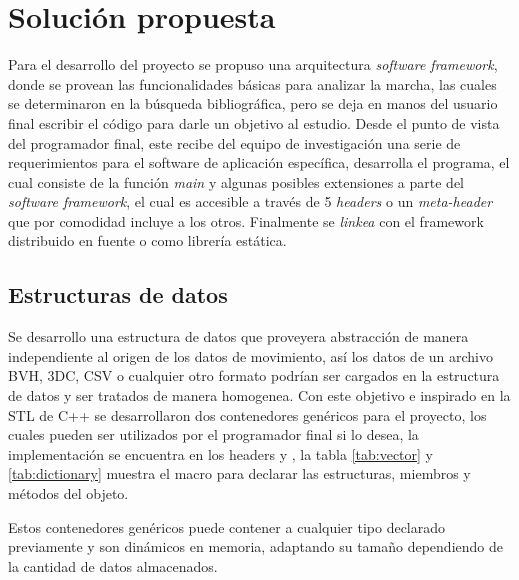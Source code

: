 \chapter{Solución propuesta}

Para el desarrollo del proyecto se propuso una arquitectura \emph{software framework}, donde se provean las funcionalidades básicas para analizar la marcha, las cuales se determinaron en la búsqueda bibliográfica, pero se deja en manos del usuario final escribir el código para darle un objetivo al estudio. Desde el punto de vista del programador final, este recibe del equipo de investigación una serie de requerimientos para el software de aplicación específica, desarrolla el programa, el cual consiste de la función \emph{main} y algunas posibles extensiones a parte del \emph{software framework}, el cual es accesible a través de 5 \emph{headers} o un \emph{meta-header} que por comodidad incluye a los otros. Finalmente se \emph{linkea} con el framework distribuido en fuente o como librería estática. 

\section{Estructuras de datos}

Se desarrollo una estructura de datos que proveyera abstracción de manera independiente al origen de los datos de movimiento, así los datos de un archivo BVH, 3DC, CSV o cualquier otro formato podrían ser cargados en la estructura de datos y ser tratados de manera homogenea. Con este objetivo e inspirado en la STL de C++ se desarrollaron dos contenedores genéricos para el proyecto, los cuales pueden ser utilizados por el programador final si lo desea, la implementación se encuentra en los headers  y , la tabla \ref{tab:vector} y \ref{tab:dictionary} muestra el macro para declarar las estructuras, miembros y métodos del objeto. 

Estos contenedores genéricos puede contener a cualquier tipo declarado previamente y son dinámicos en memoria, adaptando su tamaño dependiendo de la cantidad de datos almacenados. 

